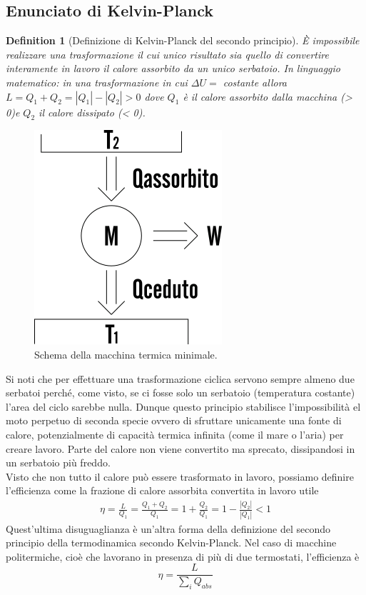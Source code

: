\documentclass[10pt,a4paper]{article}
\newtheorem{definition}{Definition}
\begin{document}
\subsection{Enunciato di Kelvin-Planck}
\begin{definition}[Definizione di Kelvin-Planck del secondo principio]
	È impossibile realizzare una trasformazione il cui unico risultato sia quello di convertire interamente in lavoro il calore assorbito da un unico serbatoio. In linguaggio matematico: in una trasformazione in cui $\Delta U =$ costante allora \(L = Q_1+Q_2 = |Q_1| - |Q_2|> 0\) dove $Q_1$ è il calore assorbito dalla macchina (> 0)e $Q_2$ il calore dissipato (< 0).
\end{definition}
\begin{figure}[h!]
	\centering
	\includegraphics[width=0.3\linewidth]{../images/macchina-termica}
	\caption{Schema della macchina termica minimale.}
	\label{fig:macchina-termica}
\end{figure}
\FloatBarrier
Si noti che per effettuare una trasformazione ciclica servono sempre almeno due serbatoi perché, come visto, se ci fosse solo un serbatoio (temperatura costante) l'area del ciclo sarebbe nulla. Dunque questo principio stabilisce l'impossibilità el moto perpetuo di seconda specie ovvero di sfruttare unicamente una fonte di calore, potenzialmente di capacità termica infinita (come il mare o l'aria) per creare lavoro. Parte del calore non viene convertito ma sprecato, dissipandosi in un serbatoio più freddo. \\
Visto che non tutto il calore può essere trasformato in lavoro, possiamo definire l'efficienza come la frazione di calore assorbita convertita in lavoro utile
\begin{align*}
	\eta = \frac{L}{Q_1} = \frac{Q_1 + Q_2}{Q_1} = 1 + \frac{Q_2}{Q_1} = 1- \frac{|Q_2|}{|Q_1|}< 1
\end{align*}
Quest'ultima disuguaglianza è un'altra forma della definizione del secondo principio della termodinamica secondo Kelvin-Planck. Nel caso di macchine politermiche, cioè che lavorano in presenza di più di due termostati, l'efficienza è 
\[\eta = \frac{L}{\sum_i Q_{abs}}\]
\end{document}
